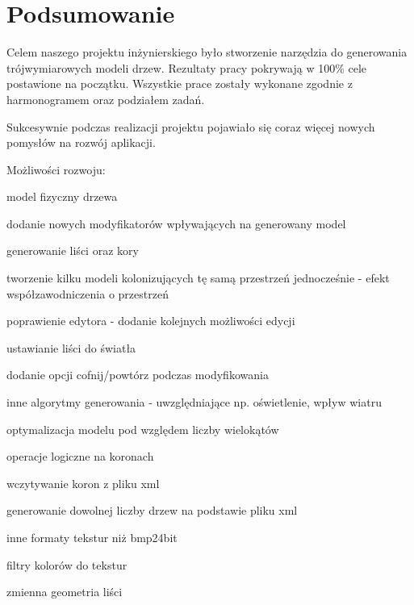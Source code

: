 \chapter{Podsumowanie}

Celem naszego projektu inżynierskiego było stworzenie narzędzia do generowania trójwymiarowych modeli drzew. Rezultaty pracy pokrywają w 100\% cele postawione na początku. Wszystkie prace zostały wykonane zgodnie z harmonogramem oraz podziałem zadań.

Sukcesywnie podczas realizacji projektu pojawiało się coraz więcej nowych pomysłów na rozwój aplikacji.

Możliwości rozwoju:
\begin{my_itemize}
	\item model fizyczny drzewa
	\item dodanie nowych modyfikatorów wpływających na generowany model
	\item generowanie liści oraz kory
	\item tworzenie kilku modeli kolonizujących tę samą przestrzeń jednocześnie - efekt współzawodniczenia o przestrzeń
	\item poprawienie edytora - dodanie kolejnych możliwości edycji
	\item ustawianie liści do światła
	\item dodanie opcji cofnij/powtórz podczas modyfikowania
	\item inne algorytmy generowania - uwzględniające np. oświetlenie, wpływ wiatru
	\item optymalizacja modelu pod względem liczby wielokątów
	\item operacje logiczne na koronach
	\item wczytywanie koron z pliku xml
	\item generowanie dowolnej liczby drzew na podstawie pliku xml
	\item inne formaty tekstur niż bmp24bit
	\item filtry kolorów do tekstur
	\item zmienna geometria liści
\end{my_itemize}
